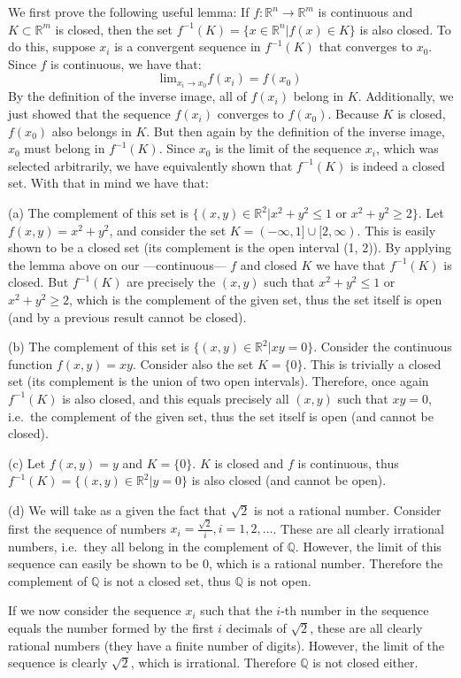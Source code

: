 \begin{solution}

    We first prove the following useful lemma: If $f:\mathbb{R}^n \rightarrow \mathbb{R}^m$ is continuous and $K \subset \mathbb{R}^m$ is closed, then the set $f^{-1}(K) = \{x \in \mathbb{R}^n \lvert f(x) \in K \}$  is also closed. To do this, suppose $x_i$ is a convergent sequence in $f^{-1}(K)$ that converges to $x_0$. Since $f$ is continuous, we have that:
    $$\text{lim}_{x_i \rightarrow x_0}f(x_i) = f(x_0)$$
    By the definition of the inverse image, all of $f(x_i)$ belong in $K$. Additionally, we just showed that the sequence $f(x_i)$ converges to $f(x_0)$. Because $K$ is closed, $f(x_0)$ also belongs in $K$. But then again by the definition of the inverse image, $x_0$ must belong in $f^{-1}(K)$. Since $x_0$ is the limit of the sequence $x_i$, which was selected arbitrarily, we have equivalently shown that $f^{-1}(K)$ is indeed a closed set. With that in mind we have that:

    (a) The complement of this set is $\{(x, y) \in \mathbb{R}^2 \lvert x^2+y^2 \leq 1 \text{ or } x^2 + y^2 \geq 2\}$. Let $f(x, y) = x^2+y^2$, and consider the set $K = (-\infty, 1] \cup [2, \infty)$. This is easily shown to be a closed set (its complement is the open interval (1, 2)). By applying the lemma above on our ---continuous--- $f$ and closed $K$ we have that $f^{-1}(K)$ is closed. But $f^{-1}(K)$ are precisely the $(x, y)$ such that $x^2+y^2 \leq 1$ or $x^2+y^2 \geq 2$, which is the complement of the given set, thus the set itself is open (and by a previous result cannot be closed).

    (b) The complement of this set is $\{(x, y) \in \mathbb{R}^2 \lvert xy = 0 \}$. Consider the continuous function $f(x, y) = xy$. Consider also the set $K=\{0\}$. This is trivially a closed set (its complement is the union of two open intervals). Therefore, once again $f^{-1}(K)$ is also closed, and this equals precisely all $(x, y)$ such that $xy = 0$, i.e.\ the complement of the given set, thus the set itself is open (and cannot be closed).

    (c) Let $f(x, y) = y$ and $K=\{0\}$. $K$ is closed and $f$ is continuous, thus $f^{-1}(K) = \{(x, y) \in \mathbb{R}^2 \lvert y = 0 \}$ is also closed (and cannot be open).

    (d) We will take as a given the fact that $\sqrt{2}$ is not a rational number. Consider first the sequence of numbers $x_i = \frac{\sqrt{2}}{i}, i = 1, 2, \ldots$. These are all clearly irrational numbers, i.e.\ they all belong in the complement of $\mathbb{Q}$. However, the limit of this sequence can easily be shown to be 0, which is a rational number. Therefore the complement of $\mathbb{Q}$ is not a closed set, thus $\mathbb{Q}$ is not open.

    If we now consider the sequence $x_i$ such that the $i$-th number in the sequence equals the number formed by the first $i$ decimals of $\sqrt{2}$, these are all clearly rational numbers (they have a finite number of digits). However, the limit of the sequence is clearly $\sqrt{2}$, which is irrational. Therefore $\mathbb{Q}$ is not closed either.
\end{solution}

